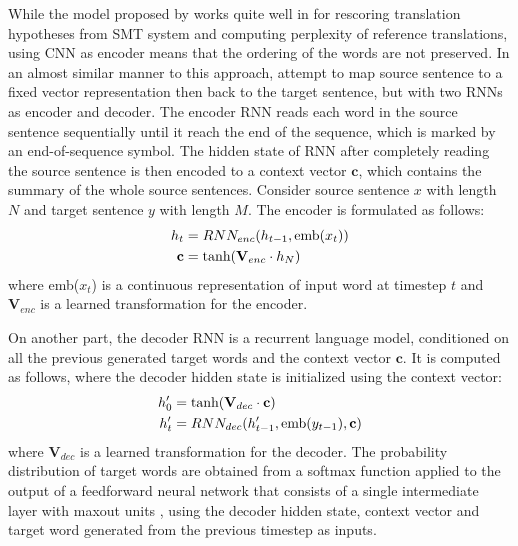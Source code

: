 \documentclass[12pt]{extarticle}
\begin{document}
While the model proposed by \citep{kalchbrenner-blunsom-2013-recurrent-continuous} works quite well in for rescoring translation hypotheses from SMT system and computing perplexity of reference translations, using CNN as encoder means that the ordering of the words are not preserved. In an almost similar manner to this approach, \citep{cho-etal-2014-learning} attempt to map source sentence to a fixed vector representation then back to the target sentence, but with two RNNs as encoder and decoder. The encoder RNN reads each word in the source sentence sequentially until it reach the end of the sequence, which is marked by an end-of-sequence symbol. The hidden state of RNN after completely reading the source sentence is then encoded to a context vector $\textbf{c}$, which contains the summary of the whole source sentences. Consider source sentence $x$ with length $N$ and target sentence $y$ with length $M$. The encoder is formulated as follows:
\begin{align}
h_{t} &= RNN_{enc}(h_{t-1}, \textnormal{emb}(x_{t})) \\
\textbf{c} &= \textnormal{tanh}(\textbf{V}_{enc} \cdot h_{N})
\end{align}
where emb($x_{t}$) is a continuous representation of input word at timestep $t$ and $\textbf{V}_{enc}$ is a learned transformation for the encoder. 

On another part, the decoder RNN is a recurrent language model, conditioned on all the previous generated target words and the context vector $\textbf{c}$. It is computed as follows, where the decoder hidden state is initialized using the context vector:
\begin{align} 
h'_{0} &= \textnormal{tanh}(\textbf{V}_{dec} \cdot \textbf{c}) \\
h'_{t} &= RNN_{dec}(h'_{t-1}, \textnormal{emb}(y_{t-1}), \textbf{c}) 
\label{eq:18}
\end{align}
where $\textbf{V}_{dec}$ is a learned transformation for the decoder. The probability distribution of target words are obtained from a softmax function applied to the output of a feedforward neural network that consists of a single intermediate layer with maxout units \citep{Goodfellow:2013:MN:3042817.3043084}, using the decoder hidden state, context vector and target word generated from the previous timestep as inputs.
\end{document}
